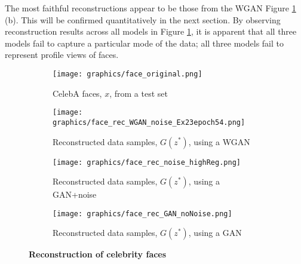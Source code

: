 \documentclass[journal]{IEEEtran}
\begin{document}
The most faithful reconstructions appear to be those from the WGAN Figure \ref{fig:face_rec} (b). This will be confirmed quantitatively in the next section. By observing reconstruction results across all models in Figure \ref{fig:face_rec}, it is apparent that all three models fail to capture a particular mode of the data; all three models fail to represent profile views of faces.




\begin{figure}[h]
    \begin{subfigure}{\columnwidth}
        \texttt{[image: graphics/face\_original.png]}
        \caption{CelebA faces, $x$, from a test set}
    \end{subfigure}
    \begin{subfigure}{\columnwidth}
        \texttt{[image: graphics/face\_rec\_WGAN\_noise\_Ex23epoch54.png]}
        \caption{Reconstructed data samples, $G(z^*)$, using a WGAN}
    \end{subfigure}
    \begin{subfigure}{\columnwidth}
        \texttt{[image: graphics/face\_rec\_noise\_highReg.png]}
        \caption{Reconstructed data samples, $G(z^*)$, using a GAN+noise}
    \end{subfigure}
    \begin{subfigure}{\columnwidth}
        \texttt{[image: graphics/face\_rec\_GAN\_noNoise.png]}
        \caption{Reconstructed data samples, $G(z^*)$, using a GAN}
    \end{subfigure}
    \caption{\textbf{Reconstruction of celebrity faces}}
    \label{fig:face_rec}
\end{figure}


\end{document}
